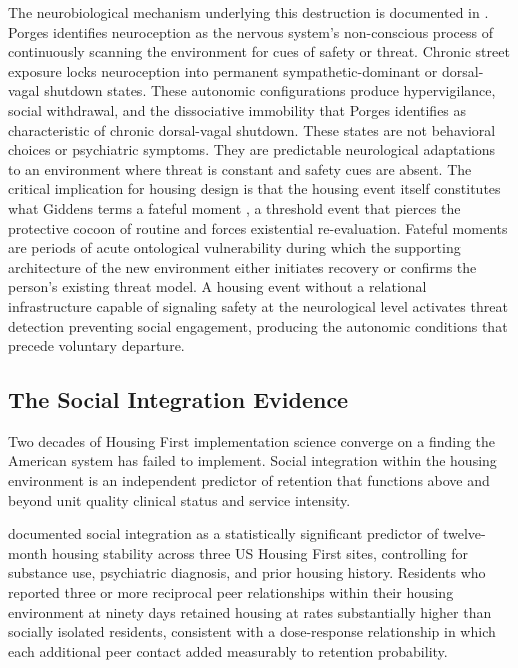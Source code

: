 \documentclass[12pt, letterpaper]{article}
\begin{document}
The neurobiological mechanism underlying this destruction is documented in \citet{porges_2011}. Porges identifies neuroception as the nervous system's non-conscious process of continuously scanning the environment for cues of safety or threat. Chronic street exposure locks neuroception into permanent sympathetic-dominant or dorsal-vagal shutdown states. These autonomic configurations produce hypervigilance, social withdrawal, and the dissociative immobility that Porges identifies as characteristic of chronic dorsal-vagal shutdown. These states are not behavioral choices or psychiatric symptoms. They are predictable neurological adaptations to an environment where threat is constant and safety cues are absent. The critical implication for housing design is that the housing event itself constitutes what Giddens terms a fateful moment \citep{giddens_1991}, a threshold event that pierces the protective cocoon of routine and forces existential re-evaluation. Fateful moments are periods of acute ontological vulnerability during which the supporting architecture of the new environment either initiates recovery or confirms the person's existing threat model. A housing event without a relational infrastructure capable of signaling safety at the neurological level activates threat detection preventing social engagement, producing the autonomic conditions that precede voluntary departure.

\subsection{The Social Integration Evidence}

Two decades of Housing First implementation science converge on a finding the American system has failed to implement. Social integration within the housing environment is an independent predictor of retention that functions above and beyond unit quality clinical status and service intensity.

\citet{tsai_2012} documented social integration as a statistically significant predictor of twelve-month housing stability across three US Housing First sites, controlling for substance use, psychiatric diagnosis, and prior housing history. Residents who reported three or more reciprocal peer relationships within their housing environment at ninety days retained housing at rates substantially higher than socially isolated residents, consistent with a dose-response relationship in which each additional peer contact added measurably to retention probability.
\end{document}
